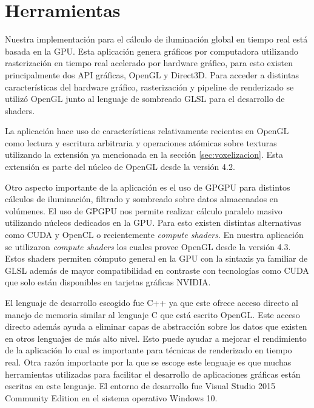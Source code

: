 \section{Herramientas}
Nuestra implementación para el cálculo de iluminación global en tiempo real está basada en la \ac{GPU}. Esta aplicación genera gráficos por computadora utilizando rasterización en tiempo real acelerado por hardware gráfico, para esto existen principalmente dos  API gráficas, OpenGL y Direct3D. Para acceder a distintas características del hardware gráfico, rasterización y pipeline de renderizado se utilizó OpenGL junto al lenguaje de sombreado GLSL para el desarrollo de shaders. 

La aplicación hace uso de características relativamente recientes en OpenGL como lectura y escritura arbitraria y operaciones atómicas sobre texturas utilizando la extensión ya mencionada en la sección \ref{sec:voxelizacion}. Esta extensión es parte del núcleo de OpenGL desde la versión 4.2. 

Otro aspecto importante de la aplicación es el uso de \ac{GPGPU} para distintos cálculos de iluminación, filtrado y sombreado sobre datos almacenados en volúmenes. El uso de \ac{GPGPU} nos permite realizar cálculo paralelo masivo utilizando núcleos dedicados en la \ac{GPU}. Para esto existen distintas alternativas como CUDA y OpenCL o recientemente \emph{compute shaders}. En nuestra aplicación se utilizaron \emph{compute shaders} los cuales provee OpenGL desde la versión 4.3. Estos shaders permiten cómputo general en la GPU con la sintaxis ya familiar de GLSL además de mayor compatibilidad en contraste con tecnologías como CUDA que solo están disponibles en tarjetas gráficas NVIDIA.

El lenguaje de desarrollo escogido fue C++ ya que este ofrece acceso directo al manejo de memoria similar al lenguaje C que está escrito OpenGL. Este acceso directo además ayuda a eliminar capas de abstracción sobre los datos que existen en otros lenguajes de más alto nivel. Esto puede ayudar a mejorar el rendimiento de la aplicación lo cual es importante para técnicas de renderizado en tiempo real. Otra razón importante por la que se escoge este lenguaje es que muchas herramientas utilizadas para facilitar el desarrollo de aplicaciones gráficas están escritas en este lenguaje. El entorno de desarrollo fue Visual Studio 2015 Community Edition en el sistema operativo Windows 10.


